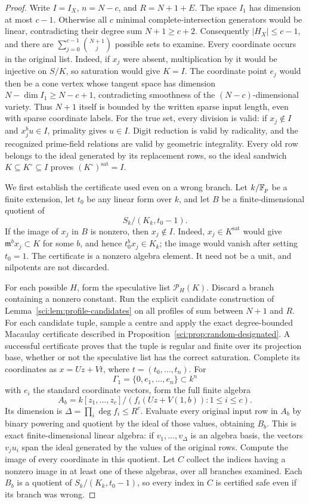 \begin{proof}
Write $I=I_X$, $n=N-c$, and $R=N+1+E$. The space $I_1$ has dimension
at most $c-1$. Otherwise all $c$ minimal complete-intersection
generators would be linear, contradicting their degree sum
$N+1\ge c+2$. Consequently $|H_X|\le c-1$, and there are
$\sum_{j=0}^{c-1}\binom{N+1}{j}$ possible sets to examine.
Every coordinate occurs in the original list. Indeed, if $x_j$ were
absent, multiplication by it would be injective on $S/K$, so saturation
would give $K=I$. The coordinate point $e_j$ would then be a cone vertex
whose tangent space has dimension $N-\dim I_1\ge N-c+1$, contradicting
smoothness of the $(N-c)$-dimensional variety. Thus $N+1$ itself is
bounded by the written sparse input length, even with sparse coordinate
labels.
For the true set, every division is valid: if $x_j\notin I$ and
$x_j^b u\in I$, primality gives $u\in I$. Digit reduction is valid by
radicality, and the recognized prime-field relations are valid by
geometric integrality. Every old row belongs to the ideal generated by its replacement rows, so the
ideal sandwich $K\subseteq K^\circ\subseteq I$ proves
$(K^\circ)^{\mathrm{sat}}=I$.

We first establish the certificate used even on a wrong branch. Let
$k/\mathbb F_p$ be a finite extension, let $t_0$ be any linear form over $k$,
and let $B$ be a finite-dimensional quotient of
\[
 S_k/(K_k,t_0-1).
\]
If the image of $x_j$ in $B$ is nonzero, then $x_j\notin I$. Indeed,
$x_j\in K^{\mathrm{sat}}$ would give
$\mathfrak m^b x_j\subset K$ for some $b$, and hence
$t_0^b x_j\in K_k$; the image would vanish after setting $t_0=1$.
The certificate is a nonzero algebra element. It need not be a unit,
and nilpotents are not discarded.

For each possible $H$, form the speculative list $\mathcal P_H(K)$.
Discard a branch containing a nonzero constant. Run the explicit candidate construction of
Lemma~\ref{sci:lem:profile-candidates} on all profiles of sum between
$N+1$ and $R$. For each candidate tuple, sample a centre and apply the
exact degree-bounded Macaulay certificate described in
Proposition~\ref{sci:prop:random-designated}.
A successful certificate proves that the tuple is regular and finite
over its projection base, whether or not the speculative list has the
correct saturation. Complete its coordinates as $x=Uz+Vt$, where
$t=(t_0,\ldots,t_n)$. For
\[
 \Gamma_1=\{0,e_1,\ldots,e_n\}\subset k^n
\]
with $e_i$ the standard coordinate vectors,
form the full finite algebra
\[
 A_b=k[z_1,\ldots,z_c]/
       (f_i(Uz+V(1,b)):1\le i\le c).
\]
Its dimension is $\Delta=\prod_i\deg f_i\le R^c$.
Evaluate every original input row in $A_b$ by binary powering and
quotient by the ideal of those values, obtaining $B_b$. This is exact
finite-dimensional linear algebra: if $v_1,\ldots,v_\Delta$ is an
algebra basis, the vectors $v_j u_i$ span the ideal generated by the
values of the original rows. Compute the image of every coordinate in
this quotient. Let $C$ collect the indices having a nonzero image in
at least one of these algebras, over all branches examined.
Each $B_b$ is a quotient of $S_k/(K_k,t_0-1)$, so every index in $C$
is certified safe even if its branch was wrong.


\end{proof}
